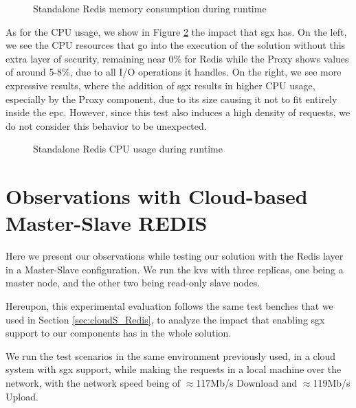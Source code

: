 \begin{figure}[htbp]
	\centering
	\caption{Standalone Redis memory consumption during runtime}
	\label{fig:MemoryConsumption_standalone}
\end{figure}

As for the CPU usage, we show in Figure \ref{fig:cpuUsageStandalone} the impact that \gls{sgx} has. On the left, we see the CPU resources that go into the execution of the solution without this extra layer of security, remaining near 0\% for Redis while the Proxy shows values of around 5-8\%, due to all I/O operations it handles. On the right, we see more expressive results, where the addition of \gls{sgx} results in higher CPU usage, especially by the Proxy component, due to its size causing it not to fit entirely inside the \gls{epc}. However, since this test also induces a high density of requests, we do not consider this behavior to be unexpected.

\begin{figure}[htbp]
	\centering
	\caption{Standalone Redis CPU usage during runtime}
	\label{fig:cpuUsageStandalone}
\end{figure}

\section{Observations with Cloud-based Master-Slave REDIS}
\label{sec:cloud_MS_Redis}

Here we present our observations while testing our solution with the Redis layer in a Master-Slave configuration. We run the \gls{kvs} with three replicas, one being a master node, and the other two being read-only slave nodes. 

Hereupon, this experimental evaluation follows the same test benches that we used in Section \ref{sec:cloudS_Redis}, to analyze the impact that enabling \gls{sgx} support to our components has in the whole solution.

We run the test scenarios in the same environment previously used, in a cloud system with \gls{sgx} support, while making the requests in a local machine over the network, with the network speed being of $\approx$117Mb/s Download and $\approx$119Mb/s Upload.



